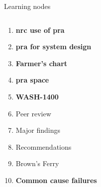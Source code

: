 \documentclass[aspectratio=1610,pdftex,dvipsnames,compress,xcolor={dvipsnames}]{beamer}
\newcommand{\acs}{\acrshort} %
\begin{document}
\begin{frame}{Learning nodes}
    \begin{columns}[t]

        \begin{column}{0.50\textwidth}
            \begin{enumerate}[series=outerlist,topsep=0pt,itemsep=1pt,leftmargin=*,label=(\arabic*)]
                \item[]\textbf{\acs{nrc} use of \acs{pra}}
                    \vspace{0.10in}
                \item[]\textbf{\acs{pra} for system design}
                    \vspace{0.10in}
                \item[]\textbf{Farmer's chart}
                    \vspace{0.10in}
                \item[]\textbf{\acs{pra} space}
                    \vspace{0.10in}
                \item[]\textbf{WASH-1400}
                \item[]Peer review  
                \item[]Major findings  
                \item[]Recommendations
                \item[]Brown's Ferry
                    \vspace{0.10in}
                \item[]\textbf{Common cause failures}
            \end{enumerate}
        \end{column}


\end{columns}
\end{frame}
\end{document}
